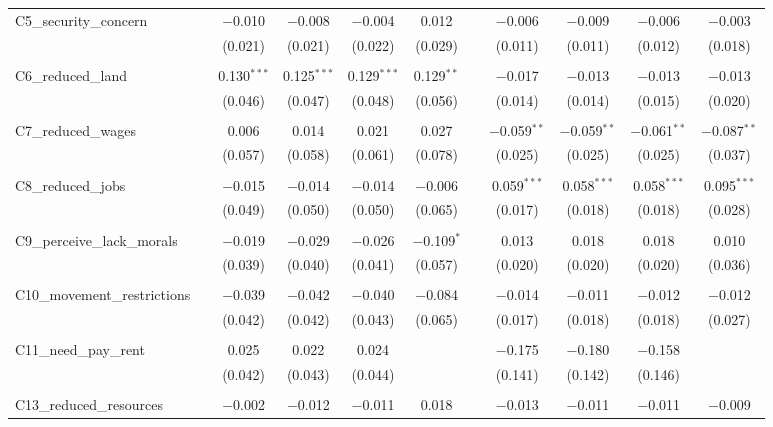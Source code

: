 \begin{table}[H]
\begin{tabular}{@{\extracolsep{4pt}}lcccccccccc}
 C5\_security\_concern &  & $-$0.010 & $-$0.008 & $-$0.004 & 0.012 &  & $-$0.006 & $-$0.009 & $-$0.006 & $-$0.003 \\ 
  &  & (0.021) & (0.021) & (0.022) & (0.029) &  & (0.011) & (0.011) & (0.012) & (0.018) \\ 
  & & & & & & & & & & \\ 
 C6\_reduced\_land &  & 0.130$^{***}$ & 0.125$^{***}$ & 0.129$^{***}$ & 0.129$^{**}$ &  & $-$0.017 & $-$0.013 & $-$0.013 & $-$0.013 \\ 
  &  & (0.046) & (0.047) & (0.048) & (0.056) &  & (0.014) & (0.014) & (0.015) & (0.020) \\ 
  & & & & & & & & & & \\ 
 C7\_reduced\_wages &  & 0.006 & 0.014 & 0.021 & 0.027 &  & $-$0.059$^{**}$ & $-$0.059$^{**}$ & $-$0.061$^{**}$ & $-$0.087$^{**}$ \\ 
  &  & (0.057) & (0.058) & (0.061) & (0.078) &  & (0.025) & (0.025) & (0.025) & (0.037) \\ 
  & & & & & & & & & & \\ 
 C8\_reduced\_jobs &  & $-$0.015 & $-$0.014 & $-$0.014 & $-$0.006 &  & 0.059$^{***}$ & 0.058$^{***}$ & 0.058$^{***}$ & 0.095$^{***}$ \\ 
  &  & (0.049) & (0.050) & (0.050) & (0.065) &  & (0.017) & (0.018) & (0.018) & (0.028) \\ 
  & & & & & & & & & & \\ 
 C9\_perceive\_lack\_morals &  & $-$0.019 & $-$0.029 & $-$0.026 & $-$0.109$^{*}$ &  & 0.013 & 0.018 & 0.018 & 0.010 \\ 
  &  & (0.039) & (0.040) & (0.041) & (0.057) &  & (0.020) & (0.020) & (0.020) & (0.036) \\ 
  & & & & & & & & & & \\ 
 C10\_movement\_restrictions &  & $-$0.039 & $-$0.042 & $-$0.040 & $-$0.084 &  & $-$0.014 & $-$0.011 & $-$0.012 & $-$0.012 \\ 
  &  & (0.042) & (0.042) & (0.043) & (0.065) &  & (0.017) & (0.018) & (0.018) & (0.027) \\ 
  & & & & & & & & & & \\ 
 C11\_need\_pay\_rent &  & 0.025 & 0.022 & 0.024 &  &  & $-$0.175 & $-$0.180 & $-$0.158 &  \\ 
  &  & (0.042) & (0.043) & (0.044) &  &  & (0.141) & (0.142) & (0.146) &  \\ 
  & & & & & & & & & & \\ 
 C13\_reduced\_resources &  & $-$0.002 & $-$0.012 & $-$0.011 & 0.018 &  & $-$0.013 & $-$0.011 & $-$0.011 & $-$0.009 \\ 

\end{tabular}
\end{table}
